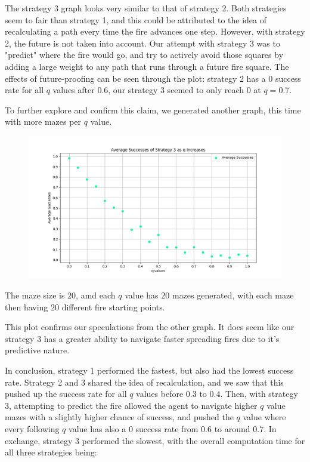 \documentclass[12pt, twoside]{article}
\begin{document}
\begin{enumerate}
        The strategy 3 graph looks very similar to that of strategy 2. Both strategies seem to fair than strategy 1, and this could be attributed to the idea of recalculating a path every time the fire advances one step. However, with strategy 2, the future is not taken into account. Our attempt with strategy 3 was to "predict" where the fire would go, and try to actively avoid those squares by adding a large weight to any path that runs through a future fire square. The effects of future-proofing can be seen through the plot: strategy 2 has a $0$ success rate for all $q$ values after $0.6$, our strategy 3 seemed to only reach $0$ at $q = 0.7$.

        To further explore and confirm this claim, we generated another graph, this time with more mazes per $q$ value.
        
        \vfill
        \pagebreak

        \begin{figure}[h]
            \centering
            \includegraphics[scale = 0.6]{strategy_3_scatter_dim_20.png}
        \end{figure}

        The maze size is $20$, amd each $q$ value has $20$ mazes generated, with each maze then having $20$ different fire starting points.

        This plot confirms our speculations from the other graph. It does seem like our strategy 3 has a greater ability to navigate faster spreading fires due to it's predictive nature.

        \vspace{4mm}
        In conclusion, strategy 1 performed the fastest, but also had the lowest success rate. Strategy 2 and 3 shared the idea of recalculation, and we saw that this pushed up the success rate for all $q$ values before $0.3$ to $0.4$. Then, with strategy 3, attempting to predict the fire allowed the agent to navigate higher $q$ value mazes with a slightly higher chance of success, and pushed the $q$ value where every following $q$ value has also a $0$ success rate from $0.6$ to around $0.7$. In exchange, strategy 3 performed the slowest, with the overall computation time for all three strategies being:


\end{enumerate}
\end{document}

